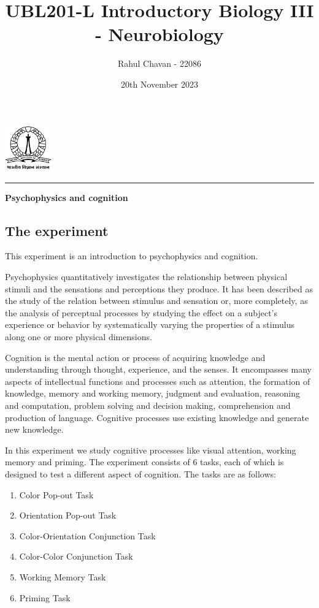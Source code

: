 \documentclass{report}
\title{\textbf{UBL201-L Introductory Biology III - Neurobiology}}
\author{Rahul Chavan - 22086}
\date{20th November 2023}
\renewcommand{\maketitle}{
 \begin{center}
    \includegraphics[width=2cm]{IISc_Master_Seal_Black.jpg}
    \vspace{0.5cm}

    \Large
    \textbf{\thetitle}
    
    \vspace{0.5cm}
    
    \Large
    \theauthor
    
    \vspace{0.2cm}
    
    \large
    \thedate

    \vspace{0.5cm}

    \hrule  
    
  \end{center}
}
\begin{document}
\maketitle
\begin{center}
    \Large
    \textbf{Psychophysics and cognition}
\end{center} 


\subsection*{The experiment}
This experiment is an introduction to psychophysics and cognition.

Psychophysics quantitatively investigates the relationship between 
physical stimuli and the sensations and perceptions they produce. 
It has been described as the study of the 
relation between stimulus and sensation or, more completely, as 
the analysis of perceptual processes by studying the effect on a 
subject's experience or behavior by systematically varying the 
properties of a stimulus along one or more physical dimensions.

Cognition is the mental action or process of acquiring knowledge 
and understanding through thought, experience, and the senses. 
It encompasses many aspects of intellectual functions and processes 
such as attention, the formation of knowledge, memory and working 
memory, judgment and evaluation, reasoning and computation, problem 
solving and decision making, comprehension and production of language. 
Cognitive processes use existing knowledge and generate new knowledge.

In this experiment we study cognitive processes like visual 
attention, working memory and priming. The experiment consists 
of 6 tasks, each of which is designed to test a different aspect 
of cognition.  The tasks are as follows:




\begin{enumerate}
    \item Color Pop-out Task
    \item Orientation Pop-out Task
    \item Color-Orientation Conjunction Task
    \item Color-Color Conjunction Task
    \item Working Memory Task
    \item Priming Task
\end{enumerate}
\end{document}
